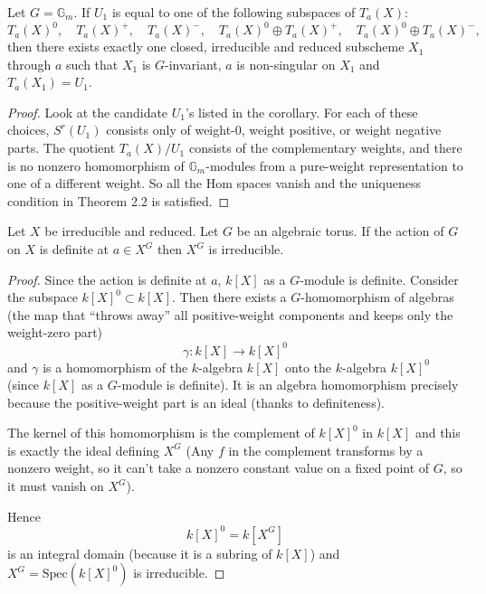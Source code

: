\documentclass[12pt]{article}
\begin{document}
\begin{corollary}
Let $G = \mathbb{G}_m$. If $U_1$ is equal to one of the following 
subspaces of $T_a(X)$: 
\[
   T_a(X)^0, \quad T_a(X)^+, \quad T_a(X)^-, \quad 
   T_a(X)^0 \oplus T_a(X)^+, \quad T_a(X)^0 \oplus T_a(X)^-,
\]
then there exists exactly one closed, irreducible and reduced subscheme 
$X_1$ through $a$ such that $X_1$ is $G$-invariant, $a$ is non-singular 
on $X_1$ and $T_a(X_1) = U_1$.
\end{corollary}

\begin{proof}
Look at the candidate $U_1$'s listed in the corollary. For each of these choices, $S^r(U_1)$ consists only of weight-0, weight positive, or weight negative parts. The quotient $T_a(X)/U_1$ consists of the complementary weights, and there is no nonzero homomorphism of $\mathbb{G}_m$-modules from a pure-weight representation to one of a different weight. So all the Hom spaces vanish and the uniqueness condition in Theorem 2.2 is satisfied.
\end{proof}

\begin{theorem}[2.3]
Let $X$ be irreducible and reduced. Let $G$ be an algebraic torus. 
If the action of $G$ on $X$ is definite at $a \in X^G$ then $X^G$ is irreducible.
\end{theorem}

\begin{proof}
Since the action is definite at $a$, $k[X]$ as a $G$-module is definite.  
Consider the subspace $k[X]^0 \subset k[X]$. Then there exists a 
$G$-homomorphism of algebras (the map that “throws away” all positive-weight components and keeps only the weight-zero part)
\[
   \gamma : k[X] \longrightarrow k[X]^0
\]
and $\gamma$ is a homomorphism of the $k$-algebra $k[X]$ onto the 
$k$-algebra $k[X]^0$ (since $k[X]$ as a $G$-module is definite). It is an algebra homomorphism precisely because the positive-weight part is an ideal (thanks to definiteness).

The kernel of this homomorphism is the complement of $k[X]^0$ in $k[X]$ 
and this is exactly the ideal defining $X^G$ (Any $f$ in the complement transforms by a nonzero weight, so it can’t take a nonzero constant value on a fixed point of $G$, so it must vanish on $X^G$).

Hence 
\[
   k[X]^0 = k[X^G]
\]
is an integral domain (because it is a subring of $k[X]$) and $X^G = \mathrm{Spec}(k[X]^0)$ is irreducible.
\end{proof}
\end{document}
